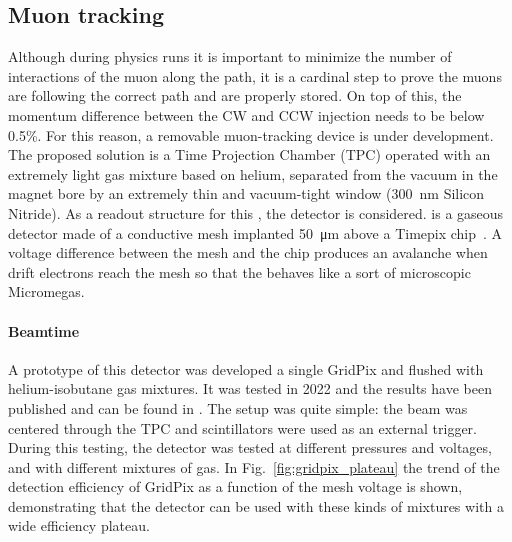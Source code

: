 \begin{refsection}
    \subsection{Muon tracking}
    \label{sec:muEDM:gridpix:beamtime}
        Although during physics runs it is important to minimize the number of interactions of the muon along the path, it is a cardinal step to prove the muons are following the correct path and are properly stored.
        On top of this, the momentum difference between the CW and CCW injection needs to be below 0.5\%.
        For this reason, a removable muon-tracking device is under development.
        The proposed solution is a Time Projection Chamber (TPC) operated with an extremely light gas mixture based on helium, separated from the vacuum in the magnet bore by an extremely thin and vacuum-tight window (\SI{300}{\nano\meter} Silicon Nitride). 
        As a readout structure for this \tpc, the \grid detector is considered. 
        \grid is a gaseous detector made of a conductive mesh implanted \SI{50}{\micro\meter} above a Timepix chip~\cite{Llopart2007NIMA}.
        A voltage difference between the mesh and the chip produces an avalanche when drift electrons reach the mesh so that the \grid behaves like a sort of microscopic Micromegas.

        \paragraph{Beamtime}
        A prototype of this detector was developed a single GridPix and flushed with helium-isobutane gas mixtures. 
        It was tested in 2022 and the results have been published and can be found in \cite{muEDM:PSI:GridPix}.
        The setup was quite simple: the beam was centered through the TPC and scintillators were used as an external trigger.
        During this testing, the detector was tested at different pressures and voltages, and with different mixtures of gas.
        In Fig.~\ref{fig:gridpix_plateau} the trend of the detection efficiency of GridPix as a function of the mesh voltage is shown, demonstrating that the detector can be used with these kinds of mixtures with a wide efficiency plateau.


\end{refsection}
